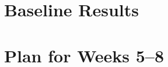 \documentclass[sigconf,nonacm]{acmart}
\begin{document}
\section{Baseline Results}

\section{Plan for Weeks 5--8}



\end{document}
